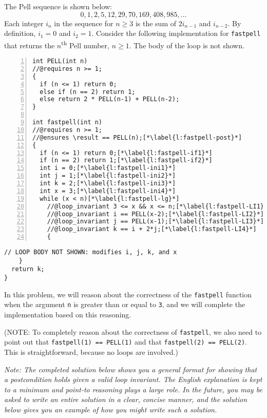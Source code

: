 \clearpage
{}

The Pell sequence is shown below:
$$
0, 1, 2, 5, 12, 29, 70, 169, 408, 985, \ldots
$$
Each integer $i_n$ in the sequence for $n \geq 3$ is the sum of
$2i_{n-1}$ and $i_{n-2}$. By definition, $i_1 = 0$ and $i_2 = 1$.
Consider the following implementation for \lstinline'fastpell' that
returns the $n$\textsuperscript{th} Pell number, $n \geq 1$. The body
of the loop is not shown.
\begin{lstlisting}[numbers=left, belowskip=0pt]
int PELL(int n)
//@requires n >= 1;
{
  if (n <= 1) return 0;
  else if (n == 2) return 1;
  else return 2 * PELL(n-1) + PELL(n-2);
}

int fastpell(int n)
//@requires n >= 1;
//@ensures \result == PELL(n);[*\label{l:fastpell-post}*]
{
  if (n <= 1) return 0;[*\label{l:fastpell-if1}*]
  if (n == 2) return 1;[*\label{l:fastpell-if2}*]
  int i = 0;[*\label{l:fastpell-ini1}*]
  int j = 1;[*\label{l:fastpell-ini2}*]
  int k = 2;[*\label{l:fastpell-ini3}*]
  int x = 3;[*\label{l:fastpell-ini4}*]
  while (x < n)[*\label{l:fastpell-lg}*]
    //@loop_invariant 3 <= x && x <= n;[*\label{l:fastpell-LI1}*]
    //@loop_invariant i == PELL(x-2);[*\label{l:fastpell-LI2}*]
    //@loop_invariant j == PELL(x-1);[*\label{l:fastpell-LI3}*]
    //@loop_invariant k == i + 2*j;[*\label{l:fastpell-LI4}*]
    {
\end{lstlisting}
\begin{lstlisting}[numbers=none,aboveskip=-0pt]
      // LOOP BODY NOT SHOWN: modifies i, j, k, and x
    }
  return k;
}
\end{lstlisting}

In this problem, we will reason about the correctness of the
\lstinline'fastpell' function when the argument \lstinline'n' is
greater than or equal to \lstinline'3', and we will complete the
implementation based on this reasoning.

(NOTE: To completely reason about the correctness of
\lstinline'fastpell', we also need to point out that
\lstinline'fastpell(1) == PELL(1)' and that %
\lstinline'fastpell(2) == PELL(2)'. This is straightforward, because
no loops are involved.)

\newpage
\emph{Note: The completed solution below shows you a general format for showing
  that a postcondition holds given a valid loop invariant. The English
  explanation is kept to a minimum and point-to reasoning
  plays a large role.  In the future, you may be asked to write an
  entire solution in a clear, concise manner, and the solution below gives
  you an example of how you might write such a solution.}


